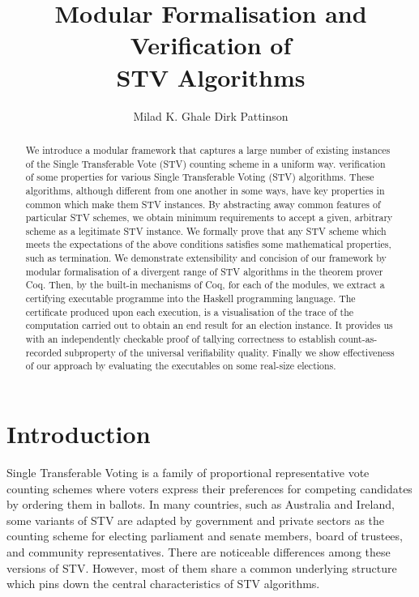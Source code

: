 \documentclass{llncs}
\title{Modular Formalisation and Verification of \\STV Algorithms}
\author{Milad K. Ghale 
\hspace*{0.5cm} Dirk Pattinson}
\institute{Research School of Computer Science, ANU, Canberra}
\begin{document}
\maketitle
\pagestyle{plain}
\thispagestyle{empty}
\begin{abstract}
We introduce a modular framework that captures a large number of
existing instances of the Single Transferable Vote (STV) counting
scheme in a uniform way. 
verification of some properties for various Single Transferable
Voting (STV) algorithms.  These algorithms, although different from
one another in some ways, have key properties in common which make
them STV instances. By abstracting away common features of
particular STV schemes, we obtain minimum requirements to accept a
given, arbitrary scheme as a legitimate STV instance. We formally
prove that any STV scheme which meets the  expectations of the above
conditions satisfies some mathematical properties, such as
termination. We demonstrate extensibility and concision of our
framework by modular formalisation of a divergent range of STV
algorithms in the theorem prover Coq. Then, by the built-in
mechanisms of Coq, for each of the modules, we extract a certifying
executable programme into the Haskell programming language. The
certificate produced upon each execution, is a visualisation of the
trace of the computation carried out to obtain an end result for an
election instance. It provides us with an independently checkable
proof of tallying correctness to establish count-as-recorded
subproperty of the universal verifiability quality. Finally we show
effectiveness of our approach by evaluating the executables on some
real-size elections.  \end{abstract}
\section{Introduction}
 Single Transferable Voting is a family of proportional representative vote counting schemes where voters express their preferences for competing candidates by ordering them in ballots. In many countries, such as Australia and Ireland, some variants of STV are adapted by government and private sectors as the counting scheme for electing parliament and senate members, board of trustees, and community representatives. There are noticeable differences among these versions of STV. However, most of them share a common underlying structure which pins down the central characteristics of STV algorithms.
 
\end{document}
